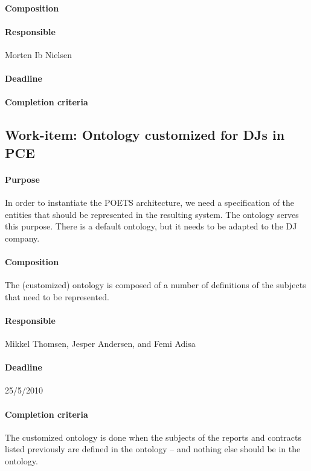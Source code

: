 \documentclass[envcountsame]{llncs}
\begin{document}
\paragraph{Composition}

\paragraph{Responsible} Morten Ib Nielsen

\paragraph{Deadline}

\paragraph{Completion criteria}

\subsection*{Work-item: Ontology customized for DJs in PCE}
\paragraph{Purpose} In order to instantiate the POETS architecture, we
need a specification of the entities that should be represented in the
resulting system. The ontology serves this purpose. There is a default
ontology, but it needs to be adapted to the DJ company.

\paragraph{Composition} The (customized) ontology is composed of a
number of definitions of the subjects that need to be represented.

\paragraph{Responsible} Mikkel Thomsen, Jesper Andersen, and Femi Adisa

\paragraph{Deadline} 25/5/2010

\paragraph{Completion criteria} The customized ontology is done when
the subjects of the reports and contracts listed previously are
defined in the ontology -- and nothing else should be in the ontology.
\end{document}
